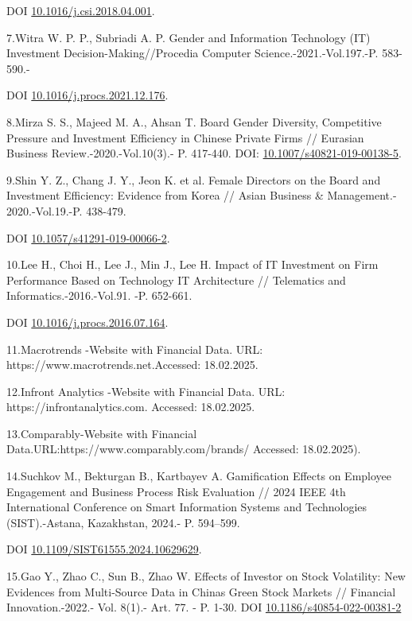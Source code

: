 \documentclass[
]{article}
\begin{document}
DOI
\href{http://dx.doi.org/10.1016/j.csi.2018.04.001}{10.1016/j.csi.2018.04.001}.

7.Witra W. P. P., Subriadi A. P. Gender and Information Technology (IT)
Investment Decision-Making//Procedia Computer Science.-2021.-Vol.197.-P.
583-590.-

DOI
\href{https://doi.org/10.1016/j.procs.2021.12.176}{10.1016/j.procs.2021.12.176}.

8.Mirza S. S., Majeed M. A., Ahsan T. Board Gender Diversity,
Competitive Pressure and Investment Efficiency in Chinese Private Firms
// Eurasian Business Review.-2020.-Vol.10(3).- P. 417-440. DOI:
\href{https://doi.org/10.1007/s40821-019-00138-5}{10.1007/s40821-019-00138-5}.

9.Shin Y. Z., Chang J. Y., Jeon K. et al. Female Directors on the Board
and Investment Efficiency: Evidence from Korea // Asian Business \&
Management.- 2020.-Vol.19.-P. 438-479.

DOI
\href{https://doi.org/10.1057/s41291-019-00066-2}{10.1057/s41291-019-00066-2}.

10.Lee H., Choi H., Lee J., Min J., Lee H. Impact of IT Investment on
Firm Performance Based on Technology IT Architecture // Telematics and
Informatics.-2016.-Vol.91. -P. 652-661.

DOI
\href{https://doi.org/10.1016/j.procs.2016.07.164}{10.1016/j.procs.2016.07.164}.

11.Macrotrends -Website with Financial Data. URL:
https://www.macrotrends.net.Accessed: 18.02.2025.

12.Infront Analytics -Website with Financial Data. URL:
https://infrontanalytics.com. Accessed: 18.02.2025.

13.Comparably-Website with Financial
Data.URL:https://www.comparably.com/brands/ Accessed: 18.02.2025).

14.Suchkov M., Bekturgan B., Kartbayev A. Gamification Effects on
Employee Engagement and Business Process Risk Evaluation // 2024 IEEE
4th International Conference on Smart Information Systems and
Technologies (SIST).-Astana, Kazakhstan, 2024.- P. 594--599.

DOI
\href{https://doi.org/10.1109/SIST61555.2024.10629629}{10.1109/SIST61555.2024.10629629}.

15.Gao Y., Zhao C., Sun B., Zhao W. Effects of Investor on Stock
Volatility: New Evidences from Multi-Source Data in
China\textquotesingle s Green Stock Markets // Financial
Innovation.-2022.- Vol. 8(1).- Art. 77. - P. 1-30. DOI
\href{https://doi.org/10.1186/s40854-022-00381-2}{10.1186/s40854-022-00381-2}
\end{document}

